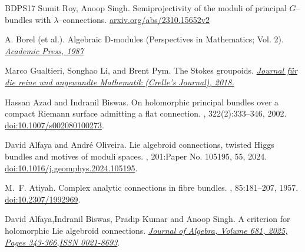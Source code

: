 \documentclass[12pt,reqno]{amsart}
\newcommand{\doi}[1]{\href{https://doi.org/#1}{doi:#1}}
\numberwithin{equation}{subsection}
\theoremstyle{definition}
\theoremstyle{theorem}
\begin{document}
\begin{thebibliography}{BDPS17}
	\newblock Sumit Roy, Anoop Singh.
	\newblock Semiprojectivity of the moduli of principal $G$--bundles with $\lambda$--connections.
	\newblock \href{https://doi.org/10.48550/arXiv.2310.15652}{arxiv.org/abs/2310.15652v2}
	
	\newblock A. Borel (et al.).
	\newblock Algebraic D-modules (Perspectives in Mathematics; Vol. 2).
	\newblock \href{https://openlibrary.org/works/OL18822165W?edition=algebraicdmodule00bore}{\em Academic Press, 1987}
	
	\newblock Marco Gualtieri, Songhao Li, and Brent Pym.
	\newblock The Stokes groupoids.
	\newblock \href{https://ora.ox.ac.uk/objects/uuid:e0cc04c7-838d-48dc-a954-68482a8d582f}{\em Journal für die reine und angewandte Mathematik (Crelle's Journal), 2018.}
	
	
	Hassan Azad and Indranil Biswas.
	\newblock On holomorphic principal bundles over a compact {R}iemann surface
	admitting a flat connection.
	, 322(2):333--346, 2002.
	\newblock \doi{10.1007/s002080100273}.
	
	\newblock David Alfaya and Andr\'{e} Oliveira.
	\newblock Lie algebroid connections, twisted {H}iggs bundles and motives of
	moduli spaces.
	, 201:Paper No. 105195, 55, 2024.
	\newblock \doi{10.1016/j.geomphys.2024.105195}.
	
	\newblock M.~F. Atiyah.
	\newblock Complex analytic connections in fibre bundles.
	, 85:181--207, 1957.
	\newblock \doi{10.2307/1992969}.
	
	\newblock David Alfaya,Indranil Biswas, Pradip Kumar and 
	Anoop Singh.
	\newblock A criterion for holomorphic Lie algebroid
	connections.
	\newblock \href{https://www.sciencedirect.com/science/article/pii/S0021869325003230}{\em Journal of Algebra, Volume 681, 2025, Pages 343-366,ISSN 0021-8693}.
	

\end{thebibliography}
\end{document}
